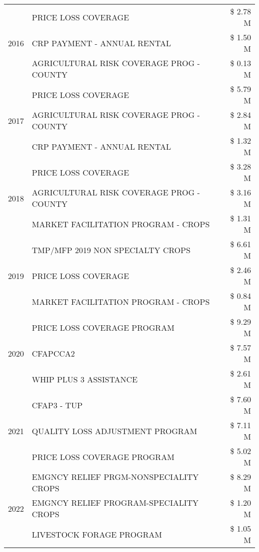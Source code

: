 \begin{tabular}{llr}
\cline{1-3}
\multirow[t]{3}{*}{2016} & PRICE LOSS COVERAGE & \$ 2.78 M \\
 & CRP PAYMENT - ANNUAL RENTAL & \$ 1.50 M \\
 & AGRICULTURAL RISK COVERAGE PROG - COUNTY & \$ 0.13 M \\
\cline{1-3}
\multirow[t]{3}{*}{2017} & PRICE LOSS COVERAGE & \$ 5.79 M \\
 & AGRICULTURAL RISK COVERAGE PROG - COUNTY & \$ 2.84 M \\
 & CRP PAYMENT - ANNUAL RENTAL & \$ 1.32 M \\
\cline{1-3}
\multirow[t]{3}{*}{2018} & PRICE LOSS COVERAGE & \$ 3.28 M \\
 & AGRICULTURAL RISK COVERAGE PROG - COUNTY & \$ 3.16 M \\
 & MARKET FACILITATION PROGRAM - CROPS & \$ 1.31 M \\
\cline{1-3}
\multirow[t]{3}{*}{2019} & TMP/MFP 2019 NON SPECIALTY CROPS & \$ 6.61 M \\
 & PRICE LOSS COVERAGE & \$ 2.46 M \\
 & MARKET FACILITATION PROGRAM - CROPS & \$ 0.84 M \\
\cline{1-3}
\multirow[t]{3}{*}{2020} & PRICE LOSS COVERAGE PROGRAM & \$ 9.29 M \\
 & CFAPCCA2 & \$ 7.57 M \\
 & WHIP PLUS 3 ASSISTANCE & \$ 2.61 M \\
\cline{1-3}
\multirow[t]{3}{*}{2021} & CFAP3 - TUP & \$ 7.60 M \\
 & QUALITY LOSS ADJUSTMENT PROGRAM & \$ 7.11 M \\
 & PRICE LOSS COVERAGE PROGRAM & \$ 5.02 M \\
\cline{1-3}
\multirow[t]{3}{*}{2022} & EMGNCY RELIEF PRGM-NONSPECIALITY CROPS & \$ 8.29 M \\
 & EMGNCY RELIEF PROGRAM-SPECIALITY CROPS & \$ 1.20 M \\
 & LIVESTOCK FORAGE PROGRAM & \$ 1.05 M \\
\cline{1-3}
\bottomrule
\end{tabular}
